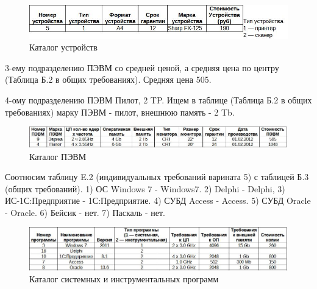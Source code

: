 \documentclass[12pt, a4paper, simple]{eskdtext}
\begin{document}
    \begin{figure}[h!]
        \centering
        \includegraphics[width=16cm]
            {_docs/ТаблицаБ1КаталогУстройств.jpg}
        \caption{Каталог устройств}
    \end{figure}

    3-ему подразделению ПЭВМ со средней ценой, а средняя цена по центру (Таблица Б.2 в общих требованиях).
    Средняя цена 505.

    4-ому подразделению ПЭВМ Пилот, 2 TP. Ищем в таблице (Таблица Б.2 в общих требованиях) марку ПЭВМ - пилот, внешнюю память - 2 Tb. 

    \begin{figure}[h!]
        \centering
        \includegraphics[width=16cm]
            {_docs/ТаблицаБ2КаталогПЭВМ.jpg}
        \caption{Каталог ПЭВМ}
    \end{figure}

    Соотносим таблицу E.2 (индивидуальных требований варината 5) с таблицей Б.3 (общих требований).
    1) ОС Windows 7 - Windows7. 2) Delphi - Delphi, 3)  ИС-1С:Предприятие - 1С:Предприятие.
    4) СУБД Access - Access. 5) СУБД Oracle - Oracle. 6) Бейсик - нет. 7) Паскаль - нет. 

    \begin{figure}[h!]
        \centering
        \includegraphics[width=16cm]
            {_docs/ТаблицаБ3КаталогСистемныхИИнструментальныхПрограмм.jpg}
        \caption{Каталог системных и инструментальных программ}
    \end{figure}

\end{document}

